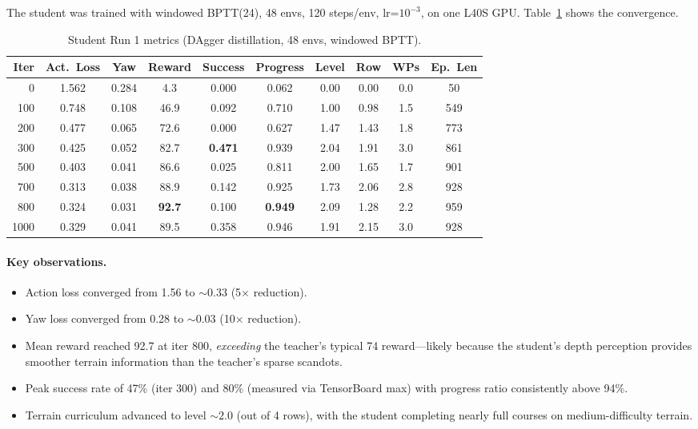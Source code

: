 \documentclass[11pt,a4paper]{article}
\begin{document}
The student was trained with windowed BPTT(24), 48 envs, 120 steps/env,
lr=$10^{-3}$, on one L40S GPU. Table~\ref{tab:student1} shows the convergence.

\begin{table}[ht]
\centering
\caption{Student Run 1 metrics (DAgger distillation, 48 envs, windowed BPTT).}
\label{tab:student1}
\small
\begin{tabular}{rccccccccc}
\toprule
Iter & Act.\ Loss & Yaw & Reward & Success & Progress & Level & Row & WPs & Ep.\ Len \\
\midrule
0    & 1.562 & 0.284 &   4.3 & 0.000 & 0.062 & 0.00 & 0.00 & 0.0 &  50 \\
100  & 0.748 & 0.108 &  46.9 & 0.092 & 0.710 & 1.00 & 0.98 & 1.5 & 549 \\
200  & 0.477 & 0.065 &  72.6 & 0.000 & 0.627 & 1.47 & 1.43 & 1.8 & 773 \\
300  & 0.425 & 0.052 &  82.7 & \textbf{0.471} & 0.939 & 2.04 & 1.91 & 3.0 & 861 \\
500  & 0.403 & 0.041 &  86.6 & 0.025 & 0.811 & 2.00 & 1.65 & 1.7 & 901 \\
700  & 0.313 & 0.038 &  88.9 & 0.142 & 0.925 & 1.73 & 2.06 & 2.8 & 928 \\
800  & 0.324 & 0.031 &  \textbf{92.7} & 0.100 & \textbf{0.949} & 2.09 & 1.28 & 2.2 & 959 \\
1000 & 0.329 & 0.041 &  89.5 & 0.358 & 0.946 & 1.91 & 2.15 & 3.0 & 928 \\
\bottomrule
\end{tabular}
\end{table}

\paragraph{Key observations.}
\begin{itemize}[nosep]
  \item Action loss converged from 1.56 to ${\sim}0.33$ (5$\times$ reduction).
  \item Yaw loss converged from 0.28 to ${\sim}0.03$ (10$\times$ reduction).
  \item Mean reward reached 92.7 at iter 800, \emph{exceeding} the teacher's
        typical 74 reward---likely because the student's depth perception
        provides smoother terrain information than the teacher's sparse scandots.
  \item Peak success rate of 47\% (iter 300) and 80\% (measured via TensorBoard
        max) with progress ratio consistently above 94\%.
  \item Terrain curriculum advanced to level ${\sim}2.0$ (out of 4 rows), with
        the student completing nearly full courses on medium-difficulty terrain.
\end{itemize}
\end{document}
